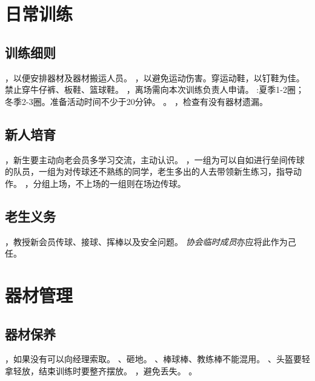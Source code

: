 \documentclass[11pt,a4paper,titlepage]{article}
\begin{document}
	\section{日常训练}
		\subsection{训练细则}
			\begin{itemize} 
				，以便安排器材及器材搬运人员。
				，以避免运动伤害。穿运动鞋，以钉鞋为佳。禁止穿牛仔裤、板鞋、篮球鞋。
				，离场需向本次训练负责人申请。
				:夏季1-2圈；冬季2-3圈。准备活动时间不少于20分钟。
				。
				，检查有没有器材遗漏。
			\end{itemize} 
		\subsection{新人培育}
			\begin{itemize} 
				，新生要主动向老会员多学习交流，主动认识。
				，一组为可以自如进行垒间传球的队员，一组为对传球还不熟练的同学，老生多出的人去带领新生练习，指导动作。
				，分组上场，不上场的一组则在场边传球。
			\end{itemize} 
		\subsection{老生义务}
			\begin{itemize} 
				，教授新会员传球、接球、挥棒以及安全问题。
				\emph{协会临时成员}亦应将此作为己任。
			\end{itemize} 
	\section{器材管理}
		\subsection{器材保养}
			\begin{enumerate} 
				，如果没有可以向经理索取。
				、砸地。
				、棒球棒、教练棒不能混用。
				、头盔要轻拿轻放，结束训练时要整齐摆放。
				，避免丢失。
				。
			\end{enumerate} 
\end{document}
